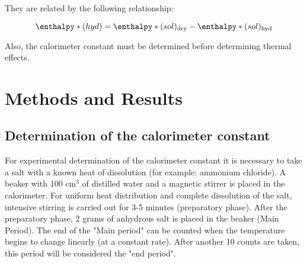 \documentclass[12pt, letterpaper]{article}
\begin{document}
        They are related by the following relationship:
        
        \begin{equation}
            \enthalpy*(hyd){} = \enthalpy*(sol){}\textsubscript{dry} - \enthalpy*(sol){}\textsubscript{hyd}    
        \end{equation}
        
        Also, the calorimeter constant must be determined before determining thermal effects. 
    \newpage
    \section{Methods and Results}
    \subsection{Determination of the calorimeter constant}
   
    For experimental determination of the calorimeter constant it is necessary to take a salt
    with a known heat of dissolution (for example: ammonium chloride).
    A beaker with 100 cm$^3$ of distilled water and a magnetic stirrer is placed in the calorimeter.
    For uniform heat distribution and complete dissolution of the salt, intensive stirring is carried out for 3-5 minutes (preparatory phase).
    After the preparatory phase, 2 grams of anhydrous salt is placed in the beaker (Main Period).
    The end of the "Main period" can be counted when the temperature begins to change linearly (at a constant rate).
    After another 10 counts are taken, this period will be considered the "end period". \\
     
\end{document}

